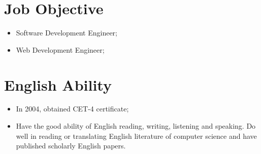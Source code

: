 \documentclass[a4paper,10pt,english]{manual}
\begin{document}
\section{Job Objective}
\begin{itemize}

\item {} 
Software Development Engineer;

\item {} 
Web Development Engineer;

\end{itemize}


\section{English Ability}
\begin{itemize}

\item {} 
In 2004, obtained CET-4 certificate;

\item {} 
Have the good ability of English reading, writing, listening and speaking. Do well in reading or translating English literature of computer science and have published scholarly English papers.

\end{itemize}
\end{document}
